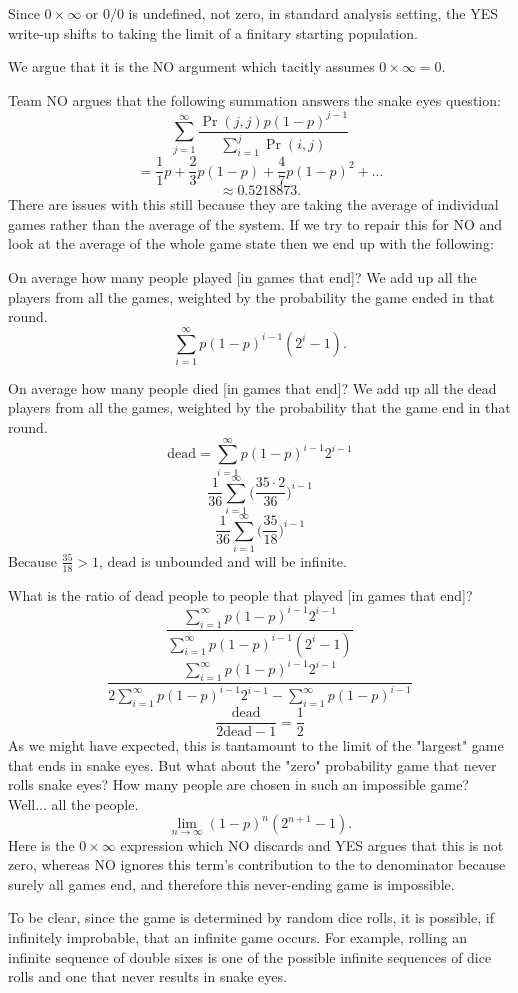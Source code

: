 \documentclass[article,twocolumn]{memoir}
\begin{document}
Since $0\times\infty$ or $0/0$ is undefined, not zero, in standard analysis setting, the YES write-up shifts to taking the limit of a finitary starting population.

We argue that it is the NO argument which tacitly assumes 
$0\times\infty=0$.

Team NO argues that the following summation answers the snake eyes question:
$$\sum_{j=1}^{\infty} \frac{\Pr(j,j)p(1-p)^{j-1}}{\sum_{i=1}^{j} \Pr(i,j)} $$
$$= \frac{1}{1}p + \frac{2}{3}p(1-p) + \frac{4}{7}p(1-p)^2 + ...$$
$$\approx 0.5218873.$$
There are issues with this still because they are taking the average of individual games rather than the average of the system. 
If we try to repair this for NO and look at the average of the whole game state then we end up with the following:

On average how many people played [in games that end]?
We add up all the players from all the games, weighted by the probability the game ended in that round.
$$\sum_{i=1}^\infty p(1-p)^{i-1}(2^i-1).$$
        
On average how many people died [in games that end]?
We add up all the dead players from all the games, weighted by the probability that the game end in that round.
$$\text{dead}=\sum_{i=1}^\infty p(1-p)^{i-1}2^{i-1}$$
$$\frac{1}{36}\sum_{i=1}^\infty \bigg(\frac{35\cdot 2}{36}\bigg)^{i-1}$$
$$\frac{1}{36}\sum_{i=1}^\infty \bigg(\frac{35}{18}\bigg)^{i-1}$$
Because $\frac{35}{18}>1$, $\text{dead}$ is unbounded and will be infinite.
        
What is the ratio of dead people to people that played [in games that end]?
$$\frac{\sum_{i=1}^\infty p(1-p)^{i-1}2^{i-1}}{\sum_{i=1}^\infty p(1-p)^{i-1}(2^i-1)}$$
$$\frac{\sum_{i=1}^\infty p(1-p)^{i-1}2^{i-1}}{2\sum_{i=1}^\infty p(1-p)^{i-1}2^{i-1}-\sum_{i=1}^\infty p(1-p)^{i-1}}$$
$$\frac{\text{dead}}{2\text{dead}-1} = \frac{1}{2}$$
As we might have expected, this is tantamount to the limit of the "largest" game that ends in snake eyes.
But what about the "zero" probability game that never rolls snake eyes? 
How many people are chosen in such an impossible game? 
Well... all the people.
$$\lim_{n\to\infty}(1-p)^n(2^{n+1}-1).$$
Here is the $0\times\infty$ expression which NO discards and YES argues that this is not zero, whereas NO ignores this term's contribution to the to denominator because surely all games end, and therefore this never-ending game is impossible.

To be clear, since the game is determined by random dice rolls, it is possible, if infinitely improbable, that an infinite game occurs.
For example, rolling an infinite sequence of double sixes is one of the possible infinite sequences of dice rolls and one that never results in snake eyes.
\end{document}
